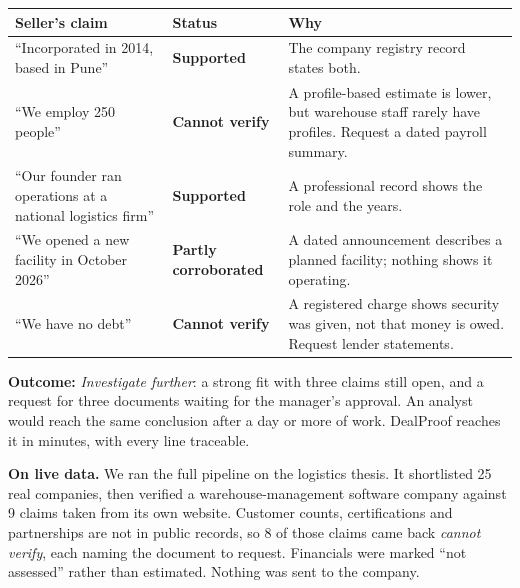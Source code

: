 \documentclass[11pt,a4paper]{article}
\begin{document}
\begin{table}[h]
\centering\small
\begin{tabularx}{\linewidth}{@{}p{5.2cm}lX@{}}
\toprule
\textbf{Seller's claim} & \textbf{Status} & \textbf{Why} \\
\midrule
``Incorporated in 2014, based in Pune'' & \textcolor{ok}{\textbf{Supported}} & The company registry record states both. \\
``We employ 250 people'' & \textcolor{gap}{\textbf{Cannot verify}} & A profile-based estimate is lower, but warehouse staff rarely have profiles. Request a dated payroll summary. \\
``Our founder ran operations at a national logistics firm'' & \textcolor{ok}{\textbf{Supported}} & A professional record shows the role and the years. \\
``We opened a new facility in October 2026'' & \textcolor{warn}{\textbf{Partly corroborated}} & A dated announcement describes a planned facility; nothing shows it operating. \\
``We have no debt'' & \textcolor{gap}{\textbf{Cannot verify}} & A registered charge shows security was given, not that money is owed. Request lender statements. \\
\bottomrule
\end{tabularx}
\end{table}
\textbf{Outcome:} \emph{Investigate further}: a strong fit with three claims still open, and a request for three documents waiting for the manager's approval. An analyst would reach the same conclusion after a day or more of work. DealProof reaches it in minutes, with every line traceable.

\textbf{On live data.} We ran the full pipeline on the logistics thesis. It shortlisted 25 real companies, then verified a warehouse-management software company against 9 claims taken from its own website. Customer counts, certifications and partnerships are not in public records, so 8 of those claims came back \emph{cannot verify}, each naming the document to request. Financials were marked ``not assessed'' rather than estimated. Nothing was sent to the company.
\end{document}
